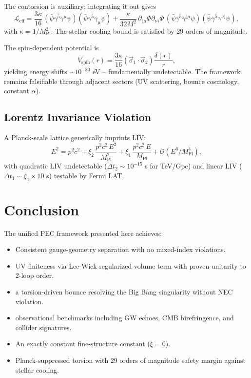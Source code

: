 \documentclass[twocolumn,prd,amsmath,amssymb]{revtex4-2}
\newcommand{\Pl}{M_{\text{Pl}}}
\begin{document}
The contorsion is auxiliary; integrating it out gives
\begin{equation}
\mathcal{L}_{\text{eff}} = \frac{3\kappa}{16}\,(\bar\psi\gamma^5\gamma^\mu\psi)
(\bar\psi\gamma^5\gamma_\mu\psi) + \frac{\kappa}{32 M^2}\,
\partial_{(\mu}\Phi\partial_{\nu)}\Phi\,
(\bar\psi\gamma^5\gamma^{(\mu}\psi)(\bar\psi\gamma^5\gamma^{\nu)}\psi),
\label{eq:4fermion}
\end{equation}
with $\kappa = 1/\Pl^2$.  The stellar cooling bound is satisfied by 29 orders of
magnitude.

The spin-dependent potential is
\begin{equation}
V_{\text{spin}}(r) = \frac{3\kappa}{16}(\vec{\sigma}_1\cdot\vec{\sigma}_2)
\frac{\delta(r)}{r},
\label{eq:spin-potential}
\end{equation}
yielding energy shifts $\sim 10^{-80}$ eV -- fundamentally undetectable.  The framework
remains falsifiable through adjacent sectors (UV scattering, bounce cosmology, constant
$\alpha$).

\subsection{Lorentz Invariance Violation}

A Planck-scale lattice generically imprints LIV:
\begin{equation}
E^2 = p^2c^2 + \xi_2\,\frac{p^2c^2\,E^2}{\Pl^2}
+ \xi_1\,\frac{p^2c^2\,E}{\Pl} + \mathcal{O}(E^6/\Pl^4),
\label{eq:liv}
\end{equation}
with quadratic LIV undetectable ($\Delta t_2 \sim 10^{-15}$ s for TeV/Gpc) and linear
LIV ($\Delta t_1 \sim \xi_1 \times 10$ s) testable by Fermi LAT.

\section{Conclusion}

The unified PEC framework presented here achieves:
\begin{itemize}
\item Consistent gauge-geometry separation with no mixed-index violations.
\item UV finiteness via Lee-Wick regularized volume term with proven unitarity to
2-loop order.
\item a torsion-driven bounce resolving the Big Bang singularity without NEC violation.
\item observational benchmarks including GW echoes, CMB birefringence,
and collider signatures.
\item An exactly constant fine-structure constant ($\xi=0$).
\item Planck-suppressed torsion with 29 orders of magnitude safety margin against
stellar cooling.
\end{itemize}
\end{document}
